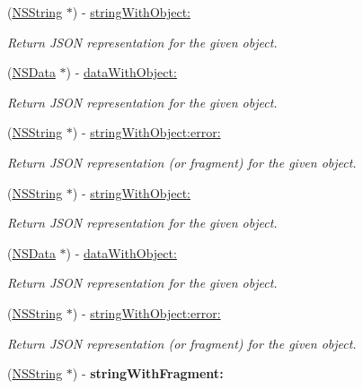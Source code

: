 \begin{DoxyCompactItemize}
(\hyperlink{class_n_s_string}{\-N\-S\-String} $\ast$) -\/ \hyperlink{interface_s_b_json_writer_a98b0a676d8bc77281759765a5cc847fc}{string\-With\-Object\-:}
\begin{DoxyCompactList}\small\item\em \-Return \-J\-S\-O\-N representation for the given object. \end{DoxyCompactList}\item 
(\hyperlink{class_n_s_data}{\-N\-S\-Data} $\ast$) -\/ \hyperlink{interface_s_b_json_writer_a3f1687aa567c4a82cb7233b512d9802b}{data\-With\-Object\-:}
\begin{DoxyCompactList}\small\item\em \-Return \-J\-S\-O\-N representation for the given object. \end{DoxyCompactList}\item 
(\hyperlink{class_n_s_string}{\-N\-S\-String} $\ast$) -\/ \hyperlink{interface_s_b_json_writer_aaf36e759fdf6bfbada41d011ed402245}{string\-With\-Object\-:error\-:}
\begin{DoxyCompactList}\small\item\em \-Return \-J\-S\-O\-N representation (or fragment) for the given object. \end{DoxyCompactList}\item 
(\hyperlink{class_n_s_string}{\-N\-S\-String} $\ast$) -\/ \hyperlink{interface_s_b_json_writer_a98b0a676d8bc77281759765a5cc847fc}{string\-With\-Object\-:}
\begin{DoxyCompactList}\small\item\em \-Return \-J\-S\-O\-N representation for the given object. \end{DoxyCompactList}\item 
(\hyperlink{class_n_s_data}{\-N\-S\-Data} $\ast$) -\/ \hyperlink{interface_s_b_json_writer_a3f1687aa567c4a82cb7233b512d9802b}{data\-With\-Object\-:}
\begin{DoxyCompactList}\small\item\em \-Return \-J\-S\-O\-N representation for the given object. \end{DoxyCompactList}\item 
(\hyperlink{class_n_s_string}{\-N\-S\-String} $\ast$) -\/ \hyperlink{interface_s_b_json_writer_aaf36e759fdf6bfbada41d011ed402245}{string\-With\-Object\-:error\-:}
\begin{DoxyCompactList}\small\item\em \-Return \-J\-S\-O\-N representation (or fragment) for the given object. \end{DoxyCompactList}\item 
\hypertarget{interface_s_b_json_writer_aa62c0d5ef6acbc23be9242a34f25524f}{
(\hyperlink{class_n_s_string}{\-N\-S\-String} $\ast$) -\/ {\bfseries string\-With\-Fragment\-:}}
\label{interface_s_b_json_writer_aa62c0d5ef6acbc23be9242a34f25524f}


\end{DoxyCompactItemize}
